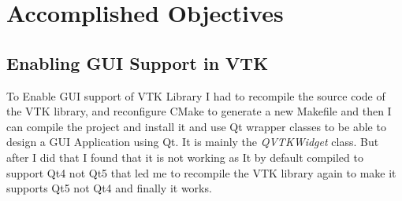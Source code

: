 \documentclass[12pt, b5paper]{article}
\begin{document}
\section{Accomplished Objectives}
\subsection{Enabling GUI Support in VTK}
To Enable GUI support of VTK Library I had to recompile the source code of the VTK library, and reconfigure CMake to generate a new Makefile and then I can compile the project and install it and use Qt wrapper classes to be able to design a GUI Application using Qt. It is mainly the \textit{QVTKWidget} class. But after I did that I found that it is not working as It by default compiled to support Qt4 not Qt5 that led me to recompile the VTK library again to make it supports Qt5 not Qt4 and finally it works.
\end{document}
